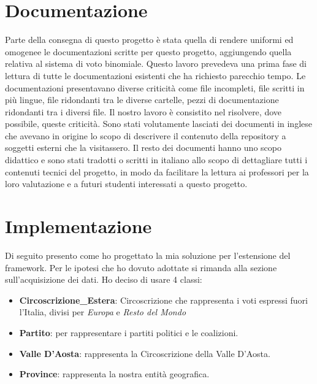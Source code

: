 \documentclass{article}
\begin{document}
\section{Documentazione}
Parte della consegna di questo progetto è stata quella di rendere uniformi ed omogenee le documentazioni scritte per questo progetto, aggiungendo quella relativa al sistema di voto binomiale.
Questo lavoro prevedeva una prima fase di lettura di tutte le documentazioni esistenti che ha richiesto parecchio tempo. Le documentazioni presentavano diverse criticità come file incompleti, file scritti in più lingue, file ridondanti tra le diverse cartelle, pezzi di documentazione ridondanti tra i diversi file.
Il nostro lavoro è consistito nel risolvere, dove possibile, queste criticità.
Sono stati volutamente lasciati dei documenti in inglese che avevano in origine lo scopo di descrivere il contenuto della repository a soggetti esterni che la visitassero.
Il resto dei documenti hanno uno scopo didattico e sono stati tradotti o scritti in italiano allo scopo di dettagliare tutti i contenuti tecnici del progetto, in modo da facilitare la lettura ai professori per la loro valutazione e a futuri studenti interessati a questo progetto.



\section{Implementazione}

Di seguito presento come ho progettato la mia soluzione per l'estensione del framework. Per le ipotesi che ho dovuto adottate si rimanda alla sezione sull'acquisizione dei dati.
Ho deciso di usare 4 classi:

\begin{itemize}
\item \textbf{Circoscrizione\_Estera}: Circoscrizione che rappresenta i voti espressi fuori l'Italia, divisi per \textit{Europa} e \textit{Resto del Mondo}
\item \textbf{Partito}: per rappresentare i partiti politici e le coalizioni.
\item \textbf{Valle D'Aosta}: rappresenta la Circoscrizione della Valle D'Aosta.
\item \textbf{Province}: rappresenta la nostra entità geografica.
\end{itemize}
\end{document}
